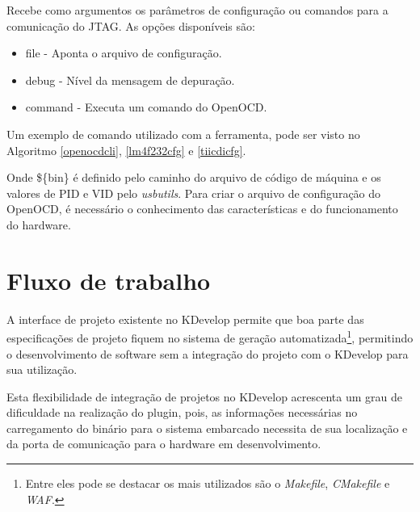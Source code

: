 Recebe como argumentos os parâmetros de configuração ou comandos para a comunicação do JTAG. As opções disponíveis são:

\begin{itemize}
\item {file} - Aponta o arquivo de configuração.
\item {debug} - Nível da mensagem de depuração.
\item {command} - Executa um comando do OpenOCD.
\end{itemize}

Um exemplo de comando utilizado com a ferramenta, pode ser visto no Algoritmo \ref{openocdcli}, \ref{lm4f232cfg} e \ref{tiicdicfg}.








Onde \$\{bin\} é definido pelo caminho do arquivo de código de máquina e os valores de PID e VID pelo \textit{usbutils}.
Para criar o arquivo de configuração do OpenOCD, é necessário o conhecimento das características e do funcionamento do hardware.

\section{Fluxo de trabalho}

A interface de projeto existente no KDevelop permite que boa parte das especificações de projeto fiquem no sistema de geração automatizada\footnote{Entre eles pode se destacar os mais utilizados são o \textit{Makefile}, \textit{CMakefile} e \textit{WAF}.}, permitindo o desenvolvimento de software sem a integração do projeto com o KDevelop para sua utilização.

Esta flexibilidade de integração de projetos no KDevelop acrescenta um grau de dificuldade na realização do plugin, pois, as informações necessárias no carregamento do binário para o sistema embarcado necessita de sua localização e da porta de comunicação para o hardware em desenvolvimento. %

